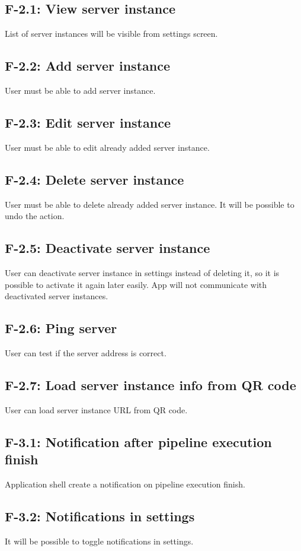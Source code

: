 \subsection*{F-2.1: View server instance}
List of server instances will be visible from settings screen.
\subsection*{F-2.2: Add server instance}
User must be able to add server instance.
\subsection*{F-2.3: Edit server instance}
User must be able to edit already added server instance.
\subsection*{F-2.4: Delete server instance}
User must be able to delete already added server instance. It will be possible to undo the action.
\subsection*{F-2.5: Deactivate server instance}
User can deactivate server instance in settings instead of deleting it, so it is possible to activate it again later easily. App will not communicate with deactivated server instances.
\subsection*{F-2.6: Ping server}
\label{subsec:ping}
User can test if the server address is correct.
\subsection*{F-2.7: Load server instance info from QR code}
\label{subsec:qrcode}
User can load server instance URL from QR code.
\subsection*{F-3.1: Notification after pipeline execution finish}
\label{subsec:notifications}
Application shell create a notification on pipeline execution finish.
\subsection*{F-3.2: Notifications in settings}
It will be possible to toggle notifications in settings.
